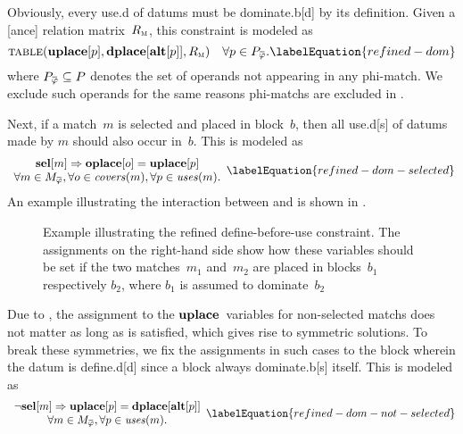 Obviously, every \gls{use.d} of \glspl{datum} must be \gls{dominate.b}[d] by its
definition.
%
Given a [ance] relation matrix~$R_{\textsc{m}}$, this
\gls{constraint} is modeled as
%
\begin{equation}
  \mTable(\mVar{uplace}[p], \mVar{dplace}[\mVar{alt}[p]], \mDomMatrix)
  \mQuantSep
  \forall p \in \mPhiOperandCompSet.
  \labelEquation{refined-dom}
\end{equation}
%
where \mbox{$\mPhiOperandCompSet \subseteq \mOperandSet$} denotes the set of
\glspl{operand} not appearing in any \gls{phi-match}.
%
We exclude such \glspl{operand} for the same reasons \glspl{phi-match} are
excluded in .

Next, if a \gls{match}~$m$ is selected and placed in \gls{block}~$b$, then all
\gls{use.d}[s] of \glspl{datum} made by $m$ should also occur in~$b$.
%
This is modeled as
%
\begin{equation}
  \begin{array}{c}
    \mVar{sel}[m] \mImp \mVar{oplace}[o] = \mVar{uplace}[p] \\
    \forall m \in \mPhiMatchCompSet,
    \forall o \in \mCovers(m),
    \forall p \in \mUses(m).
  \end{array}
  \labelEquation{refined-dom-selected}
\end{equation}
%
An example illustrating the interaction between  and
 is shown in .

\begin{figure}
  \centering%

  \caption[Example illustrating the refined define-before-use constraint]%
          {%
            Example illustrating the refined define-before-use constraint.
            The assignments on the right-hand side show how these
            variables should be set if the two matches~$m_1$ and~$m_2$ are
            placed in blocks~$b_1$ respectively $b_2$, where $b_1$ is assumed to
            dominate~$b_2$%
          }
\end{figure}

Due to , the assignment to the
$\mVar{uplace}$~\glspl{variable} for non-selected \glspl{match} does not matter
as long as  is satisfied, which gives rise to symmetric
\glspl{solution}.
%
To break these symmetries, we fix the assignments in such cases to the
\gls{block} wherein the \gls{datum} is \gls{define.d}[d] since a \gls{block}
always \gls{dominate.b}[s] itself.
%
This is modeled as
%
\begin{equation}
  \begin{array}{c}
    \neg\mVar{sel}[m] \mImp \mVar{uplace}[p] = \mVar{dplace}[\mVar{alt}[p]] \\
    \forall m \in \mPhiMatchCompSet,
    \forall p \in \mUses(m).
  \end{array}
  \labelEquation{refined-dom-not-selected}
\end{equation}

